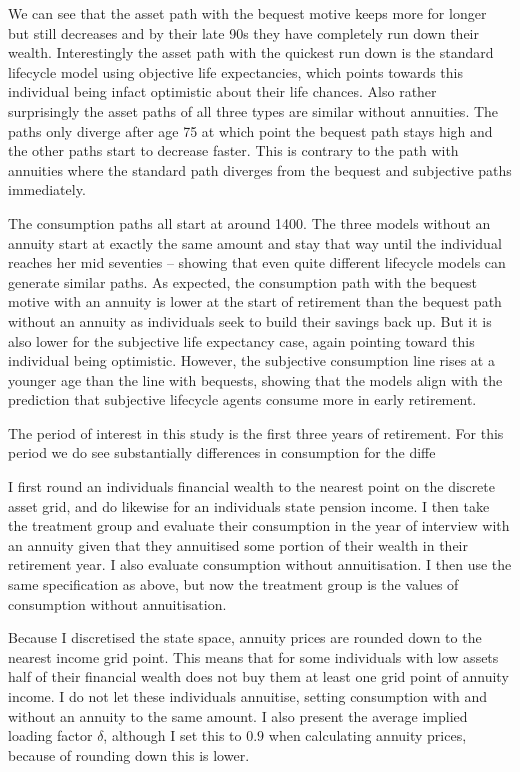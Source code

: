 \documentclass[12pt]{article}
\begin{document}
We can see that the asset path with the bequest motive keeps more for longer but still decreases
and by their late 90s they have completely run down their wealth. Interestingly the asset path
with the quickest run down is the standard lifecycle model using objective life expectancies,
which points towards this individual being infact optimistic about their life chances.
Also rather surprisingly the asset paths of all three types are similar without annuities.
The paths only diverge after age 75 at which point the bequest path stays high and the
other paths start to decrease faster. This is contrary to the path with annuities where
the standard path diverges from the bequest and subjective paths immediately.

The consumption paths all start at around 1400. The three models without an annuity start at
exactly the same amount and stay that way until the individual reaches her mid seventies -- showing
that even quite different lifecycle models can generate similar paths. As expected, the consumption
path with the bequest motive with an annuity is lower at the start of retirement than the bequest path 
without an annuity as individuals seek to build their savings back up.
But it is also lower for the subjective life expectancy case,
again pointing toward this individual being optimistic. However, the subjective consumption
line rises at a younger age than the line with bequests, showing that the models align 
with the prediction that subjective lifecycle agents consume more in early retirement.

The period of interest in this study is the first three years of retirement. For this period 
we do see substantially differences in consumption for the diffe


I first round an individuals financial wealth to the nearest point on the discrete asset grid, and
do likewise for an individuals state pension income. I then take the treatment group and evaluate
their consumption in the year of interview with an annuity given that they annuitised some portion
of their wealth in their retirement year. I also evaluate consumption without annuitisation. I then
use the same specification as above, but now the treatment group is the values of consumption without
annuitisation.

Because I discretised the state space, annuity prices are rounded down to the nearest income grid point.
This means that for some individuals with low assets half of their financial wealth does not buy them
at least one grid point of annuity income. I do not let these individuals annuitise, setting consumption
with and without an annuity to the same amount. I also present the average implied loading factor
$\delta$, although I set this to $0.9$ when calculating annuity prices, because of rounding down
this is lower.
\end{document}
